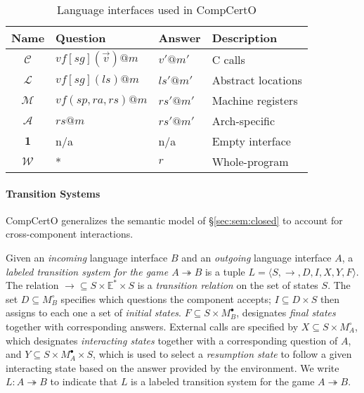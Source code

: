 \documentclass[sigplan,10pt,review,anonymous]{acmart}\settopmatter{printfolios=true,printccs=false,printacmref=false}
\newcommand{\que}{\circ}
\newcommand{\ans}{\bullet}
\begin{document}

\begin{table} %
  \begin{tabular}{clll}
    \hline
    Name & Question & Answer & Description \\
    \hline
    $\mathcal{C}$ &
      $\mathit{vf}[\mathit{sg}](\vec{v})@m$ & $v'@m'$ &
      C calls \\
    $\mathcal{L}$ &
      $\mathit{vf}[\mathit{sg}](\mathit{ls})@m$ & $\mathit{ls}'@m'$ &
      Abstract locations \\
    $\mathcal{M}$ &
      $\mathit{vf}(\mathit{sp},\mathit{ra},\mathit{rs})@m$ & $\mathit{rs}'@m'$ &
      Machine registers \\
    $\mathcal{A}$ &
      $\mathit{rs}@m$ & $\mathit{rs}'@m'$ &
      Arch-specific \\
    $\mathbf{1}$ & n/a & n/a &
      Empty interface \\
    $\mathcal{W}$ & * & $r$ &
      Whole-program \\
    \hline
  \end{tabular}
  \caption{Language interfaces used in CompCertO}
  \label{tbl:li}
\end{table}

\paragraph{Transition Systems} %

CompCertO generalizes
the semantic model of
\S\ref{sec:sem:closed}
to account for cross-component interactions.

\begin{definition}
Given an \emph{incoming} language interface $B$
and an \emph{outgoing} language interface $A$,
a \emph{labeled transition system for the game $A \twoheadrightarrow B$}
is a tuple $L = \langle S, \rightarrow, D, I, X, Y, F \rangle$.
The relation
${\rightarrow} \subseteq S \times \mathbb{E}^* \times S$ is
a \emph{transition relation} on the set of states $S$.
The set $D \subseteq M_B^\que$ specifies which
questions the component accepts;
$I \subseteq D \times S$ then
assigns to each one a set of \emph{initial states}.
$F \subseteq S \times M_B^\ans$,
designates \emph{final states} together with corresponding answers.
External calls are specified by
$X \subseteq S \times M_A^\que$,
which designates \emph{interacting states} together with
a corresponding question of $A$, and
$Y \subseteq S \times M_A^\ans \times S$,
which is used to select a \emph{resumption state}
to follow a given interacting state
based on the answer provided by the environment.
We write $L : A \twoheadrightarrow B$ to indicate that
$L$ is a labeled transition system for the game $A \twoheadrightarrow B$.
\end{definition}
\end{document}

